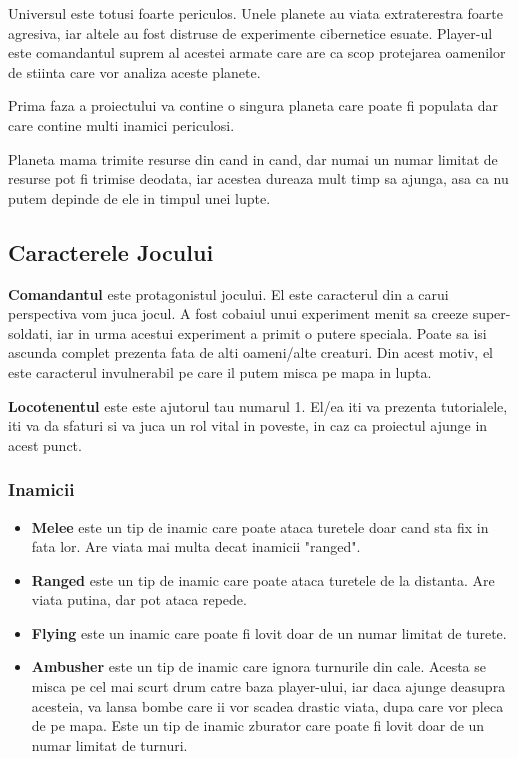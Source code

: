 \documentclass[12pt, a4paper]{article}
\begin{document}
	Universul este totusi foarte periculos. Unele planete au viata extraterestra foarte agresiva, iar altele au fost distruse de experimente cibernetice esuate. Player-ul este comandantul suprem al acestei armate care are ca scop protejarea oamenilor de stiinta care vor analiza aceste planete.
	
	Prima faza a proiectului va contine o singura planeta care poate fi populata dar care contine multi inamici periculosi.
	
	Planeta mama trimite resurse din cand in cand, dar numai un numar limitat de resurse pot fi trimise deodata, iar acestea dureaza mult timp sa ajunga, asa ca nu putem depinde de ele in timpul unei lupte.
	
	
	
	\subsection{Caracterele Jocului}
	
	\textbf{Comandantul} este protagonistul jocului. El este caracterul din a carui perspectiva vom juca jocul. A fost cobaiul unui experiment menit sa creeze super-soldati, iar in urma acestui experiment a primit o putere speciala. Poate sa isi ascunda complet prezenta fata de alti oameni/alte creaturi. Din acest motiv, el este caracterul invulnerabil pe care il putem misca pe mapa in lupta.
	
	\textbf{Locotenentul} este este ajutorul tau numarul 1. El/ea iti va prezenta tutorialele, iti va da sfaturi si va juca un rol vital in poveste, in caz ca proiectul ajunge in acest punct.
	
	
	
	\subsubsection{Inamicii}
	\begin{itemize}
		\item \textbf{Melee} este un tip de inamic care poate ataca turetele doar cand sta fix in fata lor. Are viata mai multa decat inamicii "ranged".
		\item \textbf{Ranged} este un tip de inamic care poate ataca turetele de la distanta. Are viata putina, dar pot ataca repede.
		\item \textbf{Flying} este un inamic care poate fi lovit doar de un numar limitat de turete.
		\item \textbf{Ambusher} este un tip de inamic care ignora turnurile din cale. Acesta se misca pe cel mai scurt drum catre baza player-ului, iar daca ajunge deasupra acesteia, va lansa bombe care ii vor scadea drastic viata, dupa care vor pleca de pe mapa. Este un tip de inamic zburator care poate fi lovit doar de un numar limitat de turnuri.
	\end{itemize}
\end{document}
